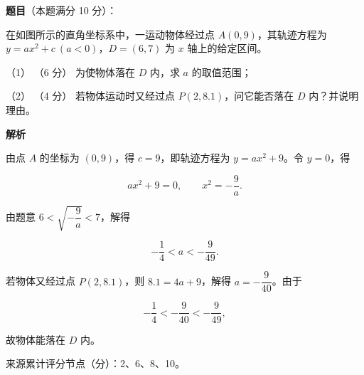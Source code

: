 \begin{answer}

\textbf{题目}（本题满分 10 分）：

在如图所示的直角坐标系中，一运动物体经过点 $A(0,9)$，其轨迹方程为 $y=ax^2+c\ (a<0)$，$D=(6,7)$ 为 $x$ 轴上的给定区间。

（1） （6 分） 为使物体落在 $D$ 内，求 $a$ 的取值范围；

（2） （4 分） 若物体运动时又经过点 $P(2,8.1)$，问它能否落在 $D$ 内？并说明理由。
\nopagebreak[4]
\begin{center}\end{center}
\nopagebreak[4]
\textbf{解析}


由点 $A$ 的坐标为 $(0,9)$，得 $c=9$，即轨迹方程为 $y=ax^2+9$。令 $y=0$，得

\nopagebreak[4]
\[
ax^2+9=0,\qquad x^2=-\dfrac9a.
\]

由题意 $6<\sqrt{-\dfrac9a}<7$，解得

\nopagebreak[4]
\[
-\dfrac14<a<-\dfrac9{49}.
\]


若物体又经过点 $P(2,8.1)$，则 $8.1=4a+9$，解得 $a=-\dfrac9{40}$。由于

\nopagebreak[4]
\[
-\dfrac14<-\dfrac9{40}<-\dfrac9{49},
\]

故物体能落在 $D$ 内。

来源累计评分节点（分）：2、6、8、10。



\end{answer}
